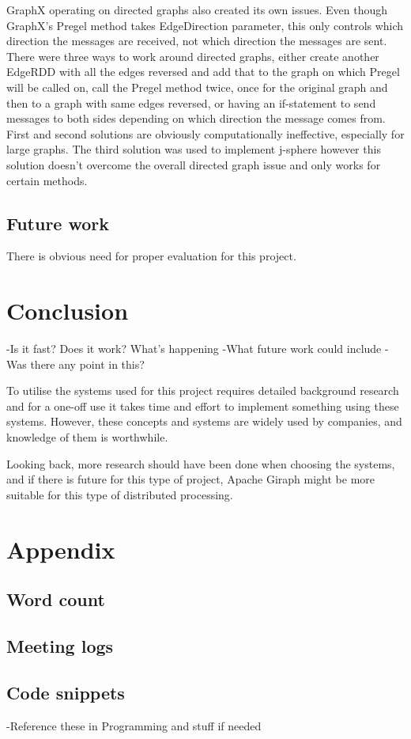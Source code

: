 \documentclass{article}
\theoremstyle{definition}
\begin{document}
GraphX operating on directed graphs also created its own issues. Even though GraphX's Pregel method takes EdgeDirection parameter, this only controls which direction the messages are received, not which direction the messages are sent. There were three ways to work around directed graphs, either create another EdgeRDD with all the edges reversed and add that to the graph on which Pregel will be called on, call the Pregel method twice, once for the original graph and then to a graph with same edges reversed, or having an if-statement to send messages to both sides depending on which direction the message comes from. First and second solutions are obviously computationally ineffective, especially for large graphs. The third solution was used to implement j-sphere however this solution doesn't overcome the overall directed graph issue and only works for certain methods. \\


\subsection{Future work}
There is obvious need for proper evaluation for this project. 

\section{Conclusion}
-Is it fast? Does it work? What's happening
-What future work could include
-Was there any point in this? 

To utilise the systems used for this project requires detailed background research and for a one-off use it takes time and effort to implement something using these systems. However, these concepts and systems are widely used by companies, and knowledge of them is worthwhile. 

Looking back, more research should have been done when choosing the systems, and if there is future for this type of project, Apache Giraph might be more suitable for this type of distributed processing. 





\section{Appendix}

\subsection{Word count}

\subsection{Meeting logs}

\subsection{Code snippets}
-Reference these in Programming and stuff if needed 
\end{document}
